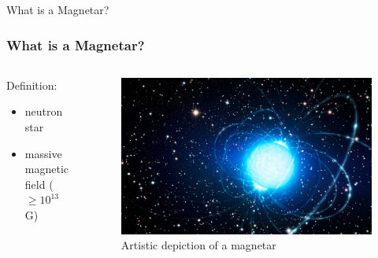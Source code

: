\documentclass[hyperref=pdftex, presentation]{beamer}
\begin{document}
\begin{frame}{\Large What is a Magnetar?}
\frametitle{\Large What is a Magnetar?}

\begin{minipage}[0.2\textheight]{\textwidth}
\begin{columns}[T]
\begin{column}{0.5\textwidth}

\begin{block}{Definition:}

\begin{itemize}
 \item<2-> neutron star%
 \item<3-> massive magnetic field ($\ge 10^{13}$ G)
\end{itemize}
\end{block}

\end{column}
\begin{column}{0.5\textwidth}
	\begin{figure}
		\includegraphics[scale=.09]{figures/magnetar_art.jpg}
		\caption{Artistic depiction of a magnetar}
	\end{figure}
\end{column}
\end{columns}
\end{minipage}

\end{frame}
\end{document}
